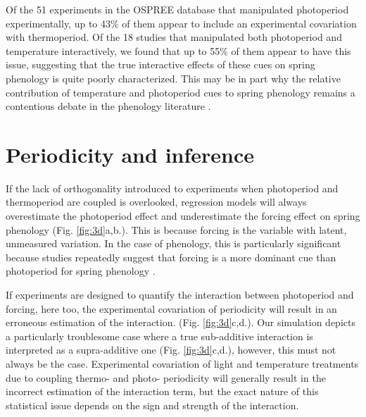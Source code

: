 \documentclass[11pt]{article}
\begin{document}
Of the 51 experiments in the OSPREE database that manipulated photoperiod experimentally, up to 43\% of them appear to include an experimental covariation with thermoperiod. Of the 18 studies that manipulated both photoperiod and temperature interactively, we found that up to 55\% of them appear to have this issue, suggesting that the true interactive effects of these cues on spring phenology is quite poorly characterized. This may be in part why the relative contribution of temperature and photoperiod cues to spring phenology remains a contentious debate in the phenology literature \citep{koerner2010a,CHUINE:2010wg,Jennifer:2010un}.

\section*{Periodicity and inference}
If the lack of orthogonality introduced to experiments when photoperiod and thermoperiod are coupled is overlooked, regression models will always overestimate the photoperiod effect and underestimate the forcing effect on spring phenology 
(Fig. \ref{fig:3d}a,b.). This is because forcing is the variable with latent, unmeasured variation. In the case of phenology, this is particularly significant because studies repeatedly suggest that forcing is a more dominant cue than photoperiod for spring phenology \citep{CHUINE:2010wg,Zohner:2016uz,Gauzere2019}.

If experiments are designed to quantify the interaction between photoperiod and forcing, here too, the experimental covariation of periodicity will result in an erroneous estimation of the interaction. (Fig. \ref{fig:3d}c,d.). Our simulation depicts a particularly troublesome case where a true sub-additive interaction is interpreted as a supra-additive one (Fig. \ref{fig:3d}c,d.), however, this must not always be the case. Experimental covariation of light and temperature treatments due to coupling thermo- and photo- periodicity will generally result in the incorrect estimation of the interaction term, but the exact nature of this statistical issue depends on the sign and strength of the interaction.

\end{document}
